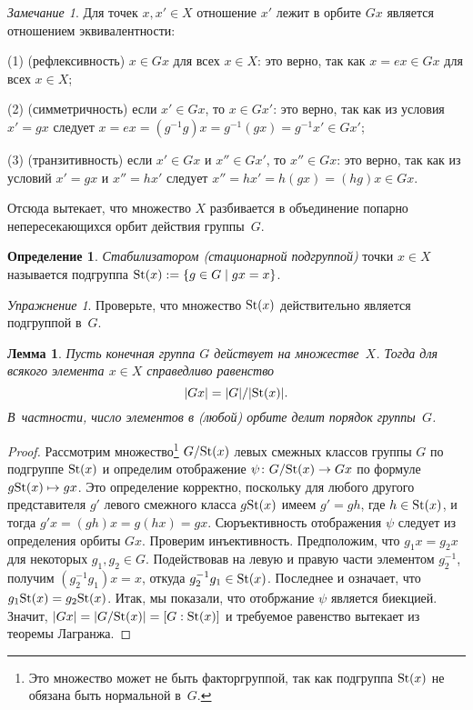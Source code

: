 \documentclass[a4paper, 12pt]{article}
\def\St{{\rm St}}%
\newtheorem{lemma}{Лемма}
\theoremstyle{definition}
\newtheorem{definition}{Определение}
\theoremstyle{remark}
\newtheorem{exercise}{Упражнение}
\newtheorem{remark}{Замечание}
\begin{document}
\begin{remark}
Для точек $x, x' \in X$ отношение \guillemotleft$x'$ лежит в орбите
$Gx$\guillemotright{} является отношением эквивалентности:

(1) (рефлексивность) $x \in Gx$ для всех $x \in X$: это верно, так
как $x = ex \in Gx$ для всех $x \in X$;

(2) (симметричность) если $x' \in Gx$, то $x \in Gx'$: это верно,
так как из условия $x' = gx$ следует $x = ex = (g^{-1}g)x =
g^{-1}(gx) = g^{-1}x' \in Gx'$;

(3) (транзитивность) если $x' \in Gx$ и $x'' \in Gx'$, то $x'' \in
Gx$: это верно, так как из условий $x' = gx$ и $x'' = hx'$ следует
$x'' = hx' = h(gx) = (hg)x \in Gx$.

Отсюда вытекает, что множество $X$ разбивается в объединение попарно
непересекающихся орбит действия группы~$G$.
\end{remark}

\begin{definition}
{\it Стабилизатором \textup(стационарной подгруппой\textup)} точки
$x \in X$ называется подгруппа $\St(x) := \{ g \in G \mid gx = x
\}$.
\end{definition}

\begin{exercise}
Проверьте, что множество $\St(x)$ действительно является подгруппой
в~$G$.
\end{exercise}

\begin{lemma}
Пусть конечная группа $G$ действует на множестве~$X$. Тогда для
всякого элемента $x\in X$ справедливо равенство
$$
|Gx| = |G| / |\St(x)|.
$$
В~частности, число элементов в \textup(любой\textup) орбите делит
порядок группы~$G$.
\end{lemma}

\begin{proof}
Рассмотрим множество\footnote{Это множество может не быть
факторгруппой, так как подгруппа $\St(x)$ не обязана быть нормальной
в~$G$.} $G / \St(x)$ левых смежных классов группы $G$ по подгруппе
$\St(x)$ и определим отображение $\psi \colon G / \St(x) \to Gx$ по
формуле $g\St(x) \mapsto gx$. Это определение корректно, поскольку
для любого другого представителя $g'$ левого смежного класса
$g\St(x)$ имеем $g' = g h$, где $h \in \St(x)$, и тогда $g'x = (gh)x
= g(hx) = gx$. Сюръективность отображения $\psi$ следует из
определения орбиты $Gx$. Проверим инъективность. Предположим, что
$g_1x = g_2x$ для некоторых $g_1, g_2 \in G$. Подействовав на левую и правую части элементом
$g_2^{-1}$, получим $(g_2^{-1}g_1)x = x$, откуда $g_2^{-1}g_1 \in
\St(x)$. Последнее и означает, что $g_1 \St(x) = g_2 \St(x)$. Итак,
мы показали, что отобржание $\psi$ является биекцией. Значит, $|Gx|
= |G / \St(x)| = [G : \St(x)]$ и требуемое равенство вытекает из
теоремы Лагранжа.
\end{proof}
\end{document}
